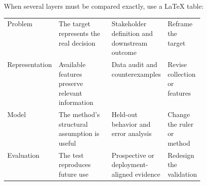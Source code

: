 When several layers must be compared exactly, use a LaTeX table:

\begin{widepar}
\footnotesize
\begin{tabularx}{\linewidth}{L{0.18\linewidth} L{0.29\linewidth} Y Y}
\toprule
{} &  &  &  \\
\midrule
Problem & The target represents the real decision & Stakeholder definition and downstream outcome & Reframe the target \\
Representation & Available features preserve relevant information & Data audit and counterexamples & Revise collection or features \\
Model & The method's structural assumption is useful & Held-out behavior and error analysis & Change the ruler or method \\
Evaluation & The test reproduces future use & Prospective or deployment-aligned evidence & Redesign the validation \\
\bottomrule
\end{tabularx}
\end{widepar}
